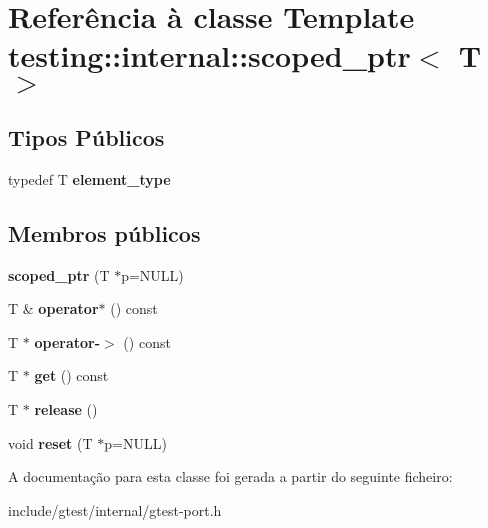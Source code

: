 \hypertarget{classtesting_1_1internal_1_1scoped__ptr}{\section{Referência à classe Template testing\-:\-:internal\-:\-:scoped\-\_\-ptr$<$ T $>$}
\label{classtesting_1_1internal_1_1scoped__ptr}
}
\subsection*{Tipos Públicos}
\begin{DoxyCompactItemize}
\item 
\hypertarget{classtesting_1_1internal_1_1scoped__ptr_ae755ffeebada8e20b68c1d1ffa91cf13}{typedef T {\bfseries element\-\_\-type}}\label{classtesting_1_1internal_1_1scoped__ptr_ae755ffeebada8e20b68c1d1ffa91cf13}

\end{DoxyCompactItemize}
\subsection*{Membros públicos}
\begin{DoxyCompactItemize}
\item 
\hypertarget{classtesting_1_1internal_1_1scoped__ptr_adb972432999a0c63720df148964ac2a5}{{\bfseries scoped\-\_\-ptr} (T $\ast$p=N\-U\-L\-L)}\label{classtesting_1_1internal_1_1scoped__ptr_adb972432999a0c63720df148964ac2a5}

\item 
\hypertarget{classtesting_1_1internal_1_1scoped__ptr_ab197837f87062de69d9d6e04539bbabe}{T \& {\bfseries operator$\ast$} () const }\label{classtesting_1_1internal_1_1scoped__ptr_ab197837f87062de69d9d6e04539bbabe}

\item 
\hypertarget{classtesting_1_1internal_1_1scoped__ptr_adc38310fbbe400faf9279e36000a17c4}{T $\ast$ {\bfseries operator-\/$>$} () const }\label{classtesting_1_1internal_1_1scoped__ptr_adc38310fbbe400faf9279e36000a17c4}

\item 
\hypertarget{classtesting_1_1internal_1_1scoped__ptr_adc8f8fcb63ce69f80f011456e6d2f08d}{T $\ast$ {\bfseries get} () const }\label{classtesting_1_1internal_1_1scoped__ptr_adc8f8fcb63ce69f80f011456e6d2f08d}

\item 
\hypertarget{classtesting_1_1internal_1_1scoped__ptr_a7a4f3e568d81a5d8bcb5f8d6bf5130b1}{T $\ast$ {\bfseries release} ()}\label{classtesting_1_1internal_1_1scoped__ptr_a7a4f3e568d81a5d8bcb5f8d6bf5130b1}

\item 
\hypertarget{classtesting_1_1internal_1_1scoped__ptr_acac03266a43359801aff0de5c990bec0}{void {\bfseries reset} (T $\ast$p=N\-U\-L\-L)}\label{classtesting_1_1internal_1_1scoped__ptr_acac03266a43359801aff0de5c990bec0}

\end{DoxyCompactItemize}


A documentação para esta classe foi gerada a partir do seguinte ficheiro\-:\begin{DoxyCompactItemize}
\item 
include/gtest/internal/gtest-\/port.\-h\end{DoxyCompactItemize}
